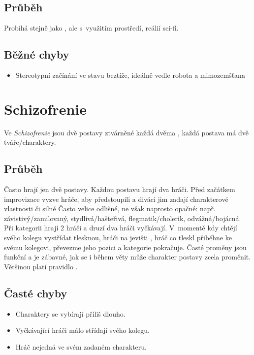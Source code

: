 \subsection{Průběh} Probíhá stejně jako , ale s~využitím prostředí, reálií sci-fi.  
\subsection{Běžné chyby} \begin{itemize}
\item Stereotypní začínání ve stavu beztíže, ideálně vedle robota a mimozemšťana
\end{itemize}
 
 
 
 
\needspace{5cm} \section{Schizofrenie} \label{schizofrenie}  
 
Ve \textit{Schizofrenie} jsou dvě postavy ztvárněné každá dvěma , každá postava má dvě tváře/charaktery. 
 
\subsection{ Průběh } Často hrají jen dvě postavy. Každou postavu hrají dva hráči. Před začátkem improvizace vyzve  hráče, aby předstoupili a diváci jim zadají charakterové vlastnosti či silné  Často velice odlišné, ne však naprosto opačné: např. závistivý/zamilovaný, stydlivá/hašteřivá, flegmatik/cholerik, odvážná/bojácná. 
Při kategorii hrají 2 hráči a druzí dva hráči vyčkávají. V~momentě kdy chtějí svého kolegu vystřídat tlesknou, hráči na jevišti , hráč co tleskl přiběhne ke svému kolegovi, převezme jeho pozici a kategorie pokračuje. Časté proměny jsou funkční a je zábavné, jak se i během věty může charakter postavy zcela proměnit. Většinou platí pravidlo  . 
 
\subsection{ Časté chyby } \begin{itemize}
\item Charaktery se vybírají příliš dlouho.
\item Vyčkávající hráči málo střídají svého kolegu.
\item Hráč nejedná ve svém zadaném charakteru.
\end{itemize}
 
